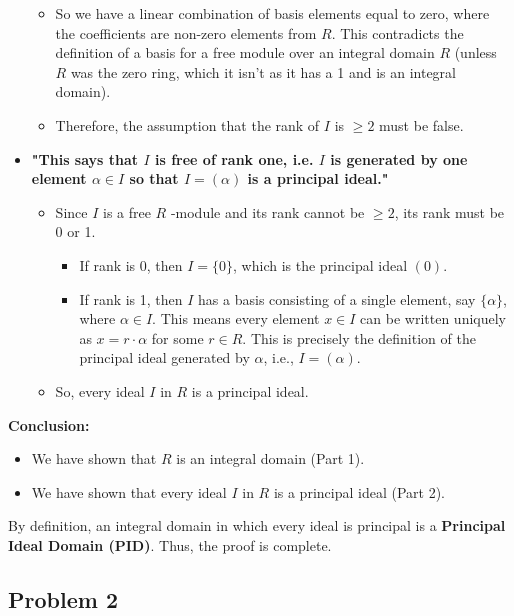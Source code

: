 \begin{itemize}
\begin{itemize}
		\item So we have a linear combination of basis elements equal to zero, where the coefficients are non-zero elements from $R$. This contradicts the definition of a basis for a free module over an integral domain $R$ (unless $R$ was the zero ring, which it isn't as it has a 1 and is an integral domain).
		\item Therefore, the assumption that the rank of $I$ is $\geq 2$ must be false.
	\end{itemize}
	\item \textbf{"This says that $I$ is free of rank one, i.e. $I$ is generated by one element $\alpha \in I$ so that $I=(\alpha)$ is a principal ideal."}
	\begin{itemize}
		\item Since $I$ is a free $R$ -module and its rank cannot be $\geq 2$, its rank must be 0 or 1.
		\begin{itemize}
			\item If rank is 0, then $I=\{0\}$, which is the principal ideal $(0)$.
			\item If rank is 1, then $I$ has a basis consisting of a single element, say $\{\alpha\}$, where $\alpha \in I$. This means every element $x \in I$ can be written uniquely as $x = r \cdot \alpha$ for some $r \in R$. This is precisely the definition of the principal ideal generated by $\alpha$, i.e., $I = (\alpha)$.
		\end{itemize}
		\item So, every ideal $I$ in $R$ is a principal ideal.
	\end{itemize}
\end{itemize}

\textbf{Conclusion:}

\begin{itemize}
	\item We have shown that $R$ is an integral domain (Part 1).
	\item We have shown that every ideal $I$ in $R$ is a principal ideal (Part 2).
\end{itemize}

By definition, an integral domain in which every ideal is principal is a \textbf{Principal Ideal Domain (PID)}.
Thus, the proof is complete.

\subsection{Problem 2}

